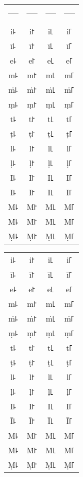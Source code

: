 \documentclass[11pt,a4paper]{article}
\newlength\vruleHeight
\newcommand\vr{\rule{0.1pt}{\vruleHeight}}
\begin{document}
\begin{multicols}{2}
  
\setlength{\vruleHeight}{265pt}

\begin{tabular}{cccc}
\vr & \vr & \vr & \vr\vspace*{-\vruleHeight}\\
i꜕ & i꜓ & i꜖ & i꜒\\
ī꜕ & ī꜓ & ī꜖ & ī꜒\\
e꜕ & e꜓ & e꜖ & e꜒\\
m꜕ & m꜓ & m꜖ & m꜒\\
ṁ꜕ & ṁ꜓ & ṁ꜖ & ṁ꜒\\
ṃ꜕ & ṃ꜓ & ṃ꜖ & ṃ꜒\\
t꜕ & t꜓ & t꜖ & t꜒\\
ṭ꜕ & ṭ꜓ & ṭ꜖ & ṭ꜒\\
l꜕ & l꜓ & l꜖ & l꜒\\
ḷ꜕ & ḷ꜓ & ḷ꜖ & ḷ꜒\\
I꜕ & I꜓ & I꜖ & I꜒\\
Ī꜕ & Ī꜓ & Ī꜖ & Ī꜒\\
M꜕ & M꜓ & M꜖ & M꜒\\
Ṁ꜕ & Ṁ꜓ & Ṁ꜖ & Ṁ꜒\\
Ṃ꜕ & Ṃ꜓ & Ṃ꜖ & Ṃ꜒\\
\end{tabular}

\columnbreak

{\itshape

\begin{tabular}{cccc}
i꜕ & i꜓ & i꜖ & i꜒\\
ī꜕ & ī꜓ & ī꜖ & ī꜒\\
e꜕ & e꜓ & e꜖ & e꜒\\
m꜕ & m꜓ & m꜖ & m꜒\\
ṁ꜕ & ṁ꜓ & ṁ꜖ & ṁ꜒\\
ṃ꜕ & ṃ꜓ & ṃ꜖ & ṃ꜒\\
t꜕ & t꜓ & t꜖ & t꜒\\
ṭ꜕ & ṭ꜓ & ṭ꜖ & ṭ꜒\\
l꜕ & l꜓ & l꜖ & l꜒\\
ḷ꜕ & ḷ꜓ & ḷ꜖ & ḷ꜒\\
I꜕ & I꜓ & I꜖ & I꜒\\
Ī꜕ & Ī꜓ & Ī꜖ & Ī꜒\\
M꜕ & M꜓ & M꜖ & M꜒\\
Ṁ꜕ & Ṁ꜓ & Ṁ꜖ & Ṁ꜒\\
Ṃ꜕ & Ṃ꜓ & Ṃ꜖ & Ṃ꜒\\
\end{tabular}

}

\end{multicols}
\end{document}
